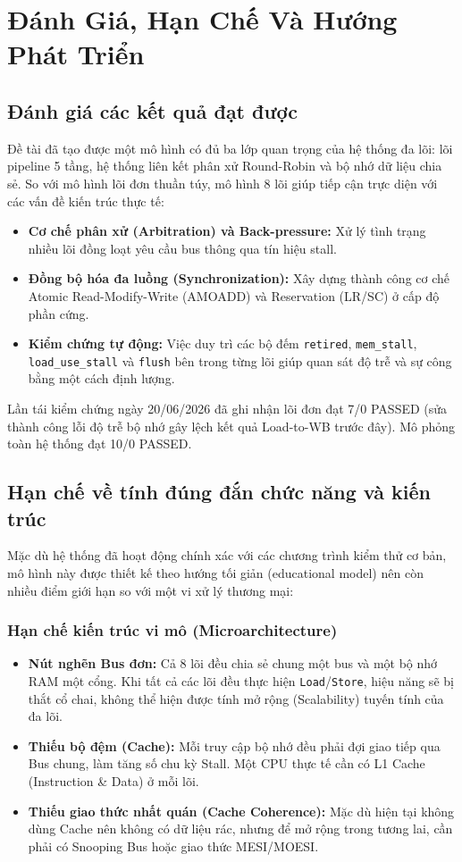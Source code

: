 \chapter{Đánh Giá, Hạn Chế Và Hướng Phát Triển}
\label{chap:evaluation}

\section{Đánh giá các kết quả đạt được}
Đề tài đã tạo được một mô hình có đủ ba lớp quan trọng của hệ thống đa lõi: lõi pipeline 5 tầng, hệ thống liên kết phân xử Round-Robin và bộ nhớ dữ liệu chia sẻ. So với mô hình lõi đơn thuần túy, mô hình 8 lõi giúp tiếp cận trực diện với các vấn đề kiến trúc thực tế:
\begin{itemize}
    \item \textbf{Cơ chế phân xử (Arbitration) và Back-pressure:} Xử lý tình trạng nhiều lõi đồng loạt yêu cầu bus thông qua tín hiệu stall.
    \item \textbf{Đồng bộ hóa đa luồng (Synchronization):} Xây dựng thành công cơ chế Atomic Read-Modify-Write (AMOADD) và Reservation (LR/SC) ở cấp độ phần cứng.
    \item \textbf{Kiểm chứng tự động:} Việc duy trì các bộ đếm \texttt{retired}, \texttt{mem\_stall}, \texttt{load\_use\_stall} và \texttt{flush} bên trong từng lõi giúp quan sát độ trễ và sự công bằng một cách định lượng.
\end{itemize}

Lần tái kiểm chứng ngày 20/06/2026 đã ghi nhận lõi đơn đạt 7/0 PASSED (sửa thành công lỗi độ trễ bộ nhớ gây lệch kết quả Load-to-WB trước đây). Mô phỏng toàn hệ thống đạt 10/0 PASSED.

\section{Hạn chế về tính đúng đắn chức năng và kiến trúc}
Mặc dù hệ thống đã hoạt động chính xác với các chương trình kiểm thử cơ bản, mô hình này được thiết kế theo hướng tối giản (educational model) nên còn nhiều điểm giới hạn so với một vi xử lý thương mại:

\subsection{Hạn chế kiến trúc vi mô (Microarchitecture)}
\begin{itemize}
    \item \textbf{Nút nghẽn Bus đơn:} Cả 8 lõi đều chia sẻ chung một bus và một bộ nhớ RAM một cổng. Khi tất cả các lõi đều thực hiện \texttt{Load}/\texttt{Store}, hiệu năng sẽ bị thắt cổ chai, không thể hiện được tính mở rộng (Scalability) tuyến tính của đa lõi.
    \item \textbf{Thiếu bộ đệm (Cache):} Mỗi truy cập bộ nhớ đều phải đợi giao tiếp qua Bus chung, làm tăng số chu kỳ Stall. Một CPU thực tế cần có L1 Cache (Instruction \& Data) ở mỗi lõi.
    \item \textbf{Thiếu giao thức nhất quán (Cache Coherence):} Mặc dù hiện tại không dùng Cache nên không có dữ liệu rác, nhưng để mở rộng trong tương lai, cần phải có Snooping Bus hoặc giao thức MESI/MOESI.
\end{itemize}

